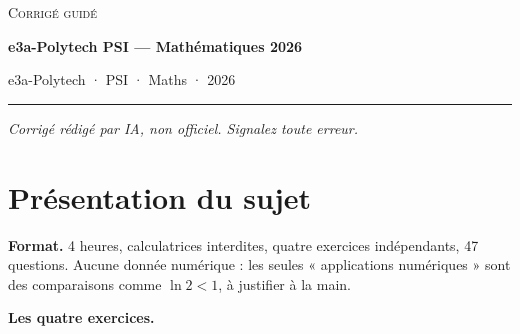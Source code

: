 \documentclass[11pt,a4paper]{article}
\begin{document}
\thispagestyle{plain}
\begin{center}
  {\small\scshape Corrigé guidé}\par\smallskip
  {\LARGE\bfseries e3a-Polytech PSI — Mathématiques 2026\par}\medskip
  {\large e3a-Polytech · PSI · Maths · 2026\par}
\end{center}
\vspace{2pt}\hrule\vspace{8pt}

\emph{Corrigé rédigé par IA, non officiel. Signalez toute erreur.}

\hypertarget{pruxe9sentation-du-sujet}{%
\section{Présentation du sujet}\label{pruxe9sentation-du-sujet}}

\textbf{Format.} 4 heures, calculatrices interdites, quatre exercices indépendants, 47 questions. Aucune donnée numérique : les seules « applications numériques » sont des comparaisons comme \(\ln2<1\), à justifier à la main.

\textbf{Les quatre exercices.}
\end{document}
